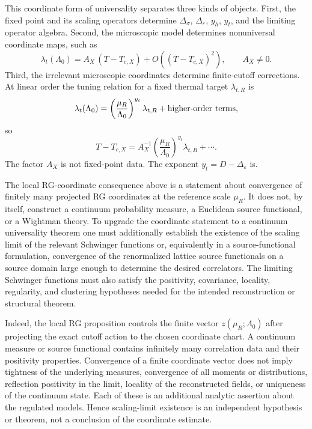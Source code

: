 This coordinate form of universality separates three kinds of objects.  First,
the fixed point and its scaling operators determine
\(\Delta_\sigma\), \(\Delta_\varepsilon\), \(y_h\), \(y_t\), and the limiting
operator algebra.  Second, the microscopic model determines nonuniversal
coordinate maps, such as
\[
  \lambda_t(\Lambda_0)
  =
  A_X\,(T-T_{c,X})+O((T-T_{c,X})^2),
  \qquad
  A_X\neq0 .
\]
Third, the irrelevant microscopic coordinates determine finite-cutoff
corrections.  At linear order the tuning relation for a fixed thermal target
\(\lambda_{t,R}\) is
\[
  \lambda_t(\Lambda_0)
  =
  \left(\frac{\mu_R}{\Lambda_0}\right)^{y_t}
  \lambda_{t,R}
  +\hbox{higher-order terms},
\]
so
\[
  T-T_{c,X}
  =
  A_X^{-1}
  \left(\frac{\mu_R}{\Lambda_0}\right)^{y_t}
  \lambda_{t,R}
  +\cdots .
\]
The factor \(A_X\) is not fixed-point data.  The exponent
\(y_t=D-\Delta_\varepsilon\) is.

\begin{remark}
\label{rem:coordinate-universality-versus-scaling-limit-existence}
The local RG-coordinate consequence above is a statement about convergence of
finitely many projected RG coordinates at the reference scale \(\mu_R\).  It
does not, by itself, construct a continuum probability measure, a Euclidean
source functional, or a Wightman theory.  To upgrade the coordinate
statement to a continuum universality theorem one must additionally establish
the existence of the scaling limit of the relevant Schwinger functions or,
equivalently in a source-functional formulation, convergence of the
renormalized lattice source functionals on a source domain large enough to
determine the desired correlators.  The limiting Schwinger functions must also
satisfy the positivity, covariance, locality, regularity, and clustering
hypotheses needed for the intended reconstruction or structural theorem.
\par

Indeed, the local RG proposition controls the finite vector
\(z(\mu_R;\Lambda_0)\) after projecting the exact cutoff action to the chosen
coordinate chart.  A continuum measure or source functional contains
infinitely many correlation data and their positivity properties.  Convergence
of a finite coordinate vector does not imply tightness of the underlying
measures, convergence of all moments or distributions, reflection positivity
in the limit, locality of the reconstructed fields, or uniqueness of the
continuum state.  Each of these is an additional analytic assertion about the
regulated models.  Hence scaling-limit existence is an independent hypothesis
or theorem, not a conclusion of the coordinate estimate.
\end{remark}

